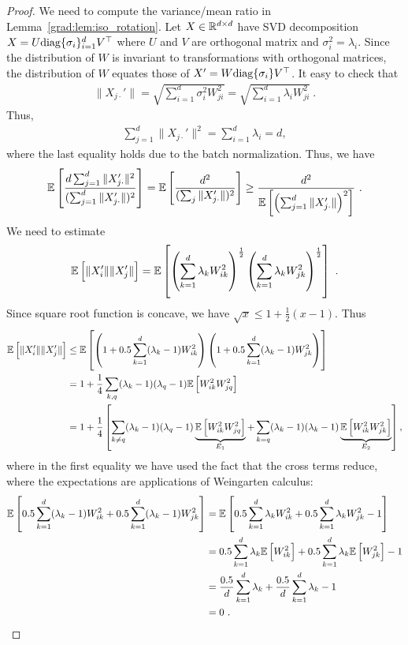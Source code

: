 \begin{proof}
We need to compute the variance/mean ratio in Lemma~\ref{grad:lem:iso_rotation}.
Let $X \in \mathbb{R}^{d \times d}$ have SVD decomposition $X = U \mathrm{diag}\{\sigma_i\}_{i=1}^d V^\top$ where $U$ and $V$ are orthogonal matrix and $\sigma_i^2 = \lambda_i$. Since the distribution of $W$ is invariant to transformations with orthogonal matrices, the distribution of $W$ equates those of $X' = W \mathrm{diag}\{\sigma_i\} V^\top$. It easy to check that 
\begin{align}
    \| X_{j\cdot}' \| = \sqrt{\sum_{i=1}^d \sigma_i^2 W_{ji}^2 } = \sqrt{\sum_{i=1}^d \lambda_i W_{ji}^2 }~.
\end{align}
Thus, 
\begin{align}
    \sum_{j=1}^d \| X_{j\cdot}' \|^2 = \sum_{i=1}^d \lambda_i = d, 
\end{align}
where the last equality holds due to the batch normalization.
Thus, we have
\begin{equation}
   \label{grad:eq:proof_iso_bound_eq1}
   \mathbb{E} \left[ \frac{d\sum_{j=1}^d \|X'_{j \cdot} \|^2}{(\sum_{j=1}^d \| X'_{j \cdot} \|)^2} \right] 
   = \mathbb{E} \left[\frac{d^2}{(\sum_j \| X'_{j \cdot} \|)^2} \right] 
   \geq \frac{d^2}{\mathbb{E} \left[ \left(\sum_{j=1}^d \| X'_{j \cdot} \|\right)^2 \right]}~.
\end{equation}
We need to estimate 
\begin{align}
    \mathbb{E} \left[ \| X_i'\| \| X_j'\| \right] = \mathbb{E} \left[ \left(\sum_{k=1}^d \lambda_k W_{ik}^2\right)^{\frac{1}{2}} \left(\sum_{k=1}^d \lambda_k W_{jk}^2\right)^{\frac{1}{2}}\right]~. 
\end{align}
Since square root function is concave, we have $\sqrt{x} \leq 1 + \frac{1}{2} (x-1)$.
Thus 
\begin{align}
    \mathbb{E} \left[\| X'_i \| \| X'_j\| \right]
& \leq \mathbb{E} \left[\left(1 + 0.5 \sum_{k=1}^d (\lambda_k-1) W_{ik}^2 \right) \left(1 + 0.5 \sum_{k=1}^d (\lambda_k-1) W_{jk}^2\right)\right] \\ 
& = 1 + \frac{1}{4} \sum_{k, q} (\lambda_k-1)(\lambda_q -1) \mathbb{E} \left[W_{ik}^2 W_{jq}^2 \right] \\
&= 1 + \frac{1}{4}\left[ \sum_{k \neq q} (\lambda_k-1)(\lambda_q -1)\underbrace{\mathbb{E} \left[ W_{ik}^2 W_{jq}^2 \right]}_{E_1} + \sum_{k=q} (\lambda_k-1)(\lambda_k -1)\underbrace{\mathbb{E} \left[ W_{ik}^2 W_{jk}^2 \right]}_{E_2} \right],
\end{align}
where in the first equality we have used the fact that the cross terms reduce, where the expectations are applications of Weingarten calculus:
\begin{align}
    \mathbb{E} \left[ 0.5 \sum_{k=1}^d(\lambda_k - 1)W_{ik}^2 + 0.5 \sum_{k=1}^d(\lambda_k - 1)W_{jk}^2 \right]
    &= \mathbb{E} \left[ 0.5 \sum_{k=1}^d \lambda_k W_{ik}^2  + 0.5 \sum_{k=1}^d \lambda_k W_{jk}^2 - 1 \right] \\
    &= 0.5 \sum_{k=1}^d \lambda_k \mathbb{E} \left[W_{ik}^2 \right] + 0.5 \sum_{k=1}^d \lambda_k \mathbb{E} \left[W_{jk}^2 \right] - 1 \\
    &= \frac{0.5}{d} \sum_{k=1}^d \lambda_k  + \frac{0.5}{d} \sum_{k=1}^d \lambda_k - 1 \\
    &= 0~.
\end{align}


\end{proof}

